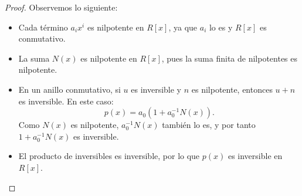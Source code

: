 \begin{proof}
	Observemos lo siguiente:
	\begin{itemize}
		\item Cada término \( a_i x^i \) es nilpotente en \( R[x] \), ya que \( a_i \) lo es y \( R[x] \) es conmutativo.
		\item La suma \( N(x) \) es nilpotente en \( R[x] \), pues la suma finita de nilpotentes es nilpotente.
		\item En un anillo conmutativo, si \( u \) es inversible y \( n \) es nilpotente, entonces \( u + n \) es inversible. En este caso:
		\[
		p(x) = a_0 (1 + a_0^{-1} N(x)).
		\]
		Como \( N(x) \) es nilpotente, \( a_0^{-1} N(x) \) también lo es, y por tanto \( 1 + a_0^{-1} N(x) \) es inversible.
		\item El producto de inversibles es inversible, por lo que \( p(x) \) es inversible en \( R[x] \).
	\end{itemize}
	
	\medskip
	
	
\end{proof}









\begin{proposicion}
\end{proposicion}

